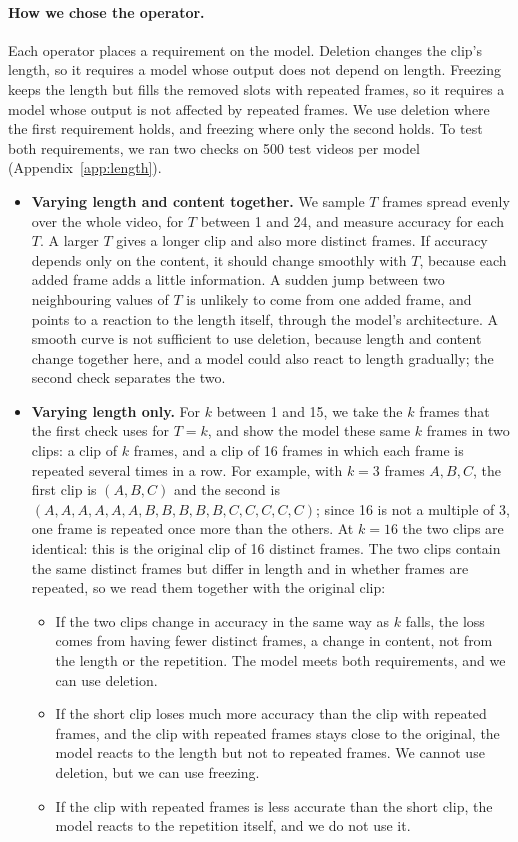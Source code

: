 \paragraph{How we chose the operator.}
Each operator places a requirement on the model.
Deletion changes the clip's length, so it requires a model whose output does not depend on length.
Freezing keeps the length but fills the removed slots with repeated frames, so it requires a model whose output is not affected by repeated frames.
We use deletion where the first requirement holds, and freezing where only the second holds.
To test both requirements, we ran two checks on 500 test videos per model (Appendix~\ref{app:length}).
\begin{itemize}
  \item \textbf{Varying length and content together.} We sample $T$ frames spread evenly over the whole video, for $T$ between 1 and 24, and measure accuracy for each $T$. A larger $T$ gives a longer clip and also more distinct frames. If accuracy depends only on the content, it should change smoothly with $T$, because each added frame adds a little information. A sudden jump between two neighbouring values of $T$ is unlikely to come from one added frame, and points to a reaction to the length itself, through the model's architecture. A smooth curve is not sufficient to use deletion, because length and content change together here, and a model could also react to length gradually; the second check separates the two.
  \item \textbf{Varying length only.} For $k$ between 1 and 15, we take the $k$ frames that the first check uses for $T = k$, and show the model these same $k$ frames in two clips: a clip of $k$ frames, and a clip of 16 frames in which each frame is repeated several times in a row. For example, with $k = 3$ frames $A, B, C$, the first clip is $(A, B, C)$ and the second is $(A, A, A, A, A, A, B, B, B, B, B, C, C, C, C, C)$; since 16 is not a multiple of 3, one frame is repeated once more than the others. At $k = 16$ the two clips are identical: this is the original clip of 16 distinct frames.
The two clips contain the same distinct frames but differ in length and in whether frames are repeated, so we read them together with the original clip:
  \begin{itemize}
    \item If the two clips change in accuracy in the same way as $k$ falls, the loss comes from having fewer distinct frames, a change in content, not from the length or the repetition. The model meets both requirements, and we can use deletion.
    \item If the short clip loses much more accuracy than the clip with repeated frames, and the clip with repeated frames stays close to the original, the model reacts to the length but not to repeated frames. We cannot use deletion, but we can use freezing.
    \item If the clip with repeated frames is less accurate than the short clip, the model reacts to the repetition itself, and we do not use it.
  \end{itemize}
\end{itemize}
